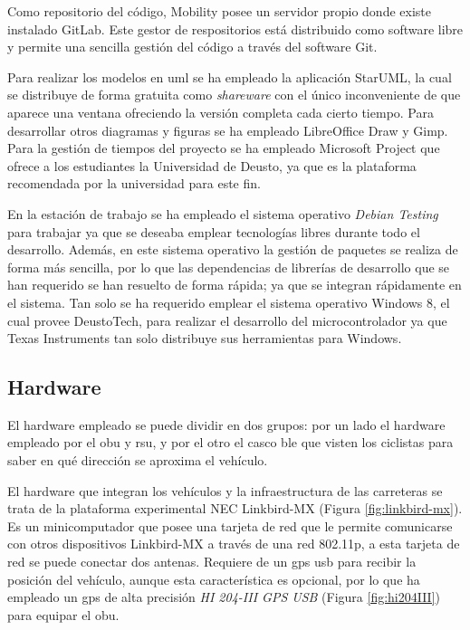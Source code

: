 Como repositorio del código, Mobility posee un servidor propio donde existe
instalado GitLab. Este gestor de respositorios está distribuido como software
libre y permite una sencilla gestión del código a través del software Git.

Para realizar los modelos en \gls{uml} se ha empleado la aplicación StarUML,
la cual se distribuye de forma gratuita como \emph{shareware} con el único
inconveniente de que aparece una ventana ofreciendo la versión completa cada
cierto tiempo. Para desarrollar otros diagramas y figuras se ha empleado
LibreOffice Draw y Gimp. Para la gestión de tiempos del proyecto se ha empleado
Microsoft Project que ofrece a los estudiantes la Universidad de Deusto, ya que
es la plataforma recomendada por la universidad para este fin.

En la estación de trabajo se ha empleado el sistema operativo \emph{Debian
Testing} para trabajar ya que se deseaba emplear tecnologías libres durante
todo el desarrollo. Además, en este sistema operativo la gestión de paquetes
se realiza de forma más sencilla, por lo que las dependencias de librerías de
desarrollo que se han requerido se han resuelto de forma rápida; ya que se
integran rápidamente en el sistema. Tan solo se ha requerido emplear el sistema
operativo Windows 8, el cual provee DeustoTech, para realizar el desarrollo
del microcontrolador ya que Texas Instruments tan solo distribuye sus
herramientas para Windows.

\subsection{Hardware}
El hardware empleado se puede dividir en dos grupos: por un lado el hardware
empleado por el \gls{obu} y \gls{rsu}, y por el otro el casco \gls{ble} que
visten los ciclistas para saber en qué dirección se aproxima el vehículo.

El hardware que integran los vehículos y la infraestructura de las carreteras
se trata de la plataforma experimental NEC Linkbird-MX (Figura
\ref{fig:linkbird-mx}). Es un minicomputador que posee una tarjeta de red que
le permite comunicarse con otros dispositivos Linkbird-MX a través de una red
\Gls{802.11p}, a esta tarjeta de red se puede conectar dos antenas. Requiere
de un \gls{gps} \gls{usb} para recibir la posición del vehículo, aunque esta
característica es opcional, por lo que ha empleado un \gls{gps} de alta
precisión \emph{HI 204-III GPS USB} (Figura \ref{fig:hi204III}) para equipar
el \gls{obu}.

